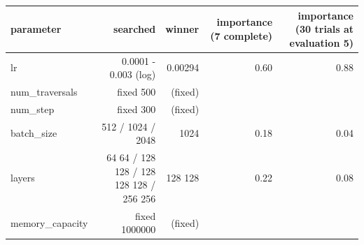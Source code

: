 \begin{tabular}{lrrrr}
\toprule
parameter & searched & winner & importance (7 complete) & importance (30 trials at evaluation 5) \\
\midrule
lr & 0.0001 - 0.003 (log) & 0.00294 & 0.60 & 0.88 \\
num\_traversals & fixed 500 & (fixed) &  &  \\
num\_step & fixed 300 & (fixed) &  &  \\
batch\_size & 512 / 1024 / 2048 & 1024 & 0.18 & 0.04 \\
layers & 64 64 / 128 128 / 128 128 128 / 256 256 & 128 128 & 0.22 & 0.08 \\
memory\_capacity & fixed 1000000 & (fixed) &  &  \\
\bottomrule
\end{tabular}
